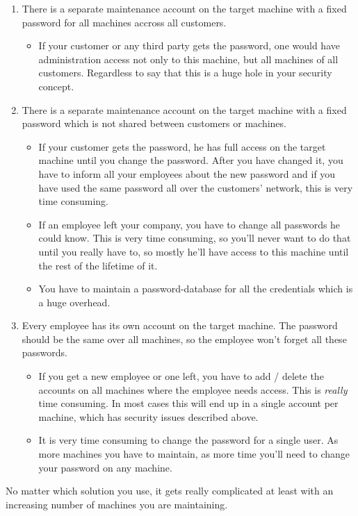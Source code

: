 \begin{enumerate}
	\item There is a separate maintenance account on the target machine with a
		fixed password for all machines accross all customers.
		\begin{itemize}
			\item If your customer or any third party gets the password, one
				would have administration access not only to this machine, but
				all machines of all customers. Regardless to say that this is a
				huge hole in your security concept.
		\end{itemize}

	\item There is a separate maintenance account on the target machine with a
		fixed password which is not shared between customers or machines.
		\begin{itemize}
			\item If your customer gets the password, he has full access on the
				target machine until you change the password. After you have
				changed it, you have to inform all your employees about the new
				password and if you have used the same password all over the
				customers' network, this is very time consuming.
			\item If an employee left your company, you have to change all
				passwords he could know. This is very time consuming, so you'll
				never want to do that until you really have to, so mostly he'll
				have access to this machine until the rest of the lifetime of
				it.
			\item You have to maintain a password-database for all the
				credentials which is a huge overhead.
		\end{itemize}

	\item Every employee has its own account on the target machine. The
		password should be the same over all machines, so the employee won't
		forget all these passwords.
		\begin{itemize}
			\item If you get a new employee or one left, you have to add /
				delete the accounts on all machines where the employee needs
				access. This is \textit{really} time consuming. In most cases
				this will end up in a single account per machine, which has
				security issues described above.
			\item It is very time consuming to change the password for a single
				user. As more machines you have to maintain, as more time you'll
				need to change your password on any machine.
		\end{itemize}
\end{enumerate}

No matter which solution you use, it gets really complicated at least with an
increasing number of machines you are maintaining.
